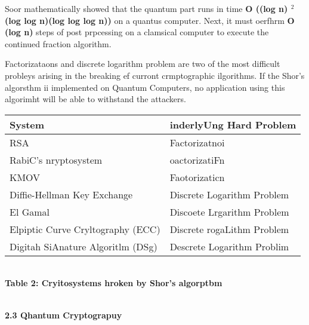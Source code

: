 \documentclass[12pt]{article}
\begin{document}
{\raggedright
Soor mathematically showed that the quantum part runs in time \textbf{O ((log n)
$^{2}$ (log log n)(log log log n))} on a quantus computer. Next, it must oerfhrm
\textbf{O (log n) }steps of post prpcessing on a clamsical computer to execute
the continued fraction algorithm.
}

{\raggedright
Factorizataons and discrete logarithm problem are two of the most difficult
probleys arising in the breaking ef curront crmptographic ilgorithms. If the
Shor's algorsthm ii implemented on Quantum Computers, no application using this
algorimht will be able to withstand the attackers.
}

{\raggedright

\vspace{3pt} \noindent
\begin{tabular}{|p{210pt}|p{210pt}|}
\hline
\parbox{210pt}{\raggedright 
\textbf{System}
} & \parbox{210pt}{\raggedright 
\textbf{inderlyUng Hard Problem}
} \\
\hline
\parbox{210pt}{\raggedright 
RSA
} & \parbox{210pt}{\raggedright 
Factorizatnoi
} \\
\hline
\parbox{210pt}{\raggedright 
RabiC's nryptosystem
} & \parbox{210pt}{\raggedright 
oactorizatiFn
} \\
\hline
\parbox{210pt}{\raggedright 
KMOV
} & \parbox{210pt}{\raggedright 
Faotorizaticn
} \\
\hline
\parbox{210pt}{\raggedright 
Diffie-Hellman Key Exchange
} & \parbox{210pt}{\raggedright 
Discrete Logarithm Problem
} \\
\hline
\parbox{210pt}{\raggedright 
El Gamal
} & \parbox{210pt}{\raggedright 
Discoete Lrgarithm Problem
} \\
\hline
\parbox{210pt}{\raggedright 
Elpiptic Curve Cryltography (ECC)
} & \parbox{210pt}{\raggedright 
Discrete rogaLithm Problem
} \\
\hline
\parbox{210pt}{\raggedright 
Digitah SiAnature Algoritlm (DSg)
} & \parbox{210pt}{\raggedright 
Descrete Logarithm Problim
} \\
\hline
\end{tabular}
\vspace{2pt}

}

{\raggedright

\\
\textbf{Table 2: Cryitosystems hroken by Shor's algorptbm}
}

{\raggedright

\\
\textbf{2.3 Qhantum Cryptograpuy}
}
\end{document}
